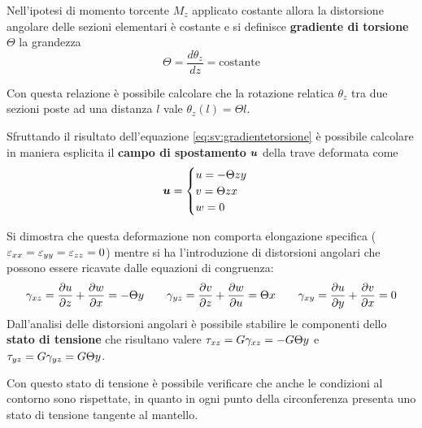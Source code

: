     	\begin{concetto}
    	    Nell'ipotesi di momento torcente $M_z$ applicato costante allora la distorsione angolare delle sezioni elementari è costante e si definisce \textbf{gradiente di torsione} $\Theta$ la grandezza
    	    \begin{equation} \label{eq:sv:gradientetorsione}
    	        \Theta =\frac{d\theta_z}{dz} =\textrm{costante}
    	    \end{equation}
    	\end{concetto}
    	Con questa relazione è possibile calcolare che la rotazione relatica $\theta_z$ tra due sezioni poste ad una distanza $l$ vale $\theta_z(l)=\Theta l$.
    	\begin{concetto}
    	    Sfruttando il risultato dell'equazione \ref{eq:sv:gradientetorsione} è possibile calcolare in maniera esplicita il \textbf{campo di spostamento} $\boldsymbol{u}$ della trave deformata come
    	    \begin{equation}
    	        \boldsymbol{u} = \begin{cases}
    	            u =- \Theta z y \\ v =\Theta z x \\ w =0
    	        \end{cases}
    	    \end{equation}
    	\end{concetto}
    	Si dimostra che questa deformazione non comporta elongazione specifica ($\varepsilon_{xx} = \varepsilon_{yy} = \varepsilon_{zz} = 0$) mentre si ha l'introduzione di distorsioni angolari che possono essere ricavate dalle equazioni di congruenza:
    	\[ \gamma_{xz} = \frac{\partial u}{\partial z} + \frac{\partial w}{\partial x} = -\Theta y \qquad \gamma_{yz} = \frac{\partial v}{\partial z} + \frac{\partial w}{\partial u} =\Theta x \qquad \gamma_{xy} = \frac{\partial u}{\partial y} + \frac{\partial v}{\partial x} = 0 \]
    	Dall'analisi delle distorsioni angolari è possibile stabilire le componenti dello \textbf{stato di tensione} che risultano valere $\tau_{xz} = G \gamma_{xz} = - G \Theta y$ e $\tau_{yz} =G \gamma_{yz} =G \Theta y$.
    	
    	
    	Con questo stato di tensione è possibile verificare che anche le condizioni al contorno sono rispettate, in quanto in ogni punto della circonferenza presenta uno stato di tensione tangente al mantello.
    	
